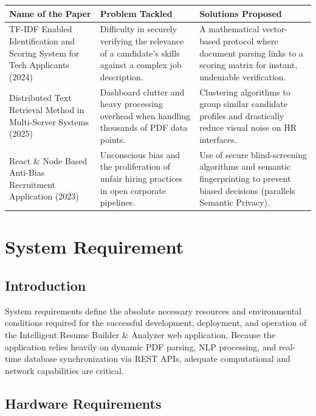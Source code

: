 \documentclass[12pt,a4paper]{report}
\begin{document}
\begin{table}[htbp]
\centering
\normalsize
\setlength{\tabcolsep}{6pt}
\renewcommand{\arraystretch}{1.5}

\begin{tabularx}{\textwidth}{|X|X|X|}
\hline
\textbf{Name of the Paper} & \textbf{Problem Tackled} & \textbf{Solutions Proposed} \\
\hline
TF-IDF Enabled Identification and Scoring System for Tech Applicants (2024)
& Difficulty in securely verifying the relevance of a candidate's skills against a complex job description.
& A mathematical vector-based protocol where document parsing links to a scoring matrix for instant, undeniable verification. \\
\hline
Distributed Text Retrieval Method in Multi-Server Systems (2025)
& Dashboard clutter and heavy processing overhead when handling thousands of PDF data points.
& Clustering algorithms to group similar candidate profiles and drastically reduce visual noise on HR interfaces. \\
\hline
React \& Node Based Anti-Bias Recruitment Application (2023)
& Unconscious bias and the proliferation of unfair hiring practices in open corporate pipelines.
& Use of secure blind-screening algorithms and semantic fingerprinting to prevent biased decisions (parallels Semantic Privacy). \\
\hline
\end{tabularx}
\end{table}

\chapter{System Requirement}

\section{Introduction}

System requirements define the absolute necessary resources and environmental conditions required for the successful development, deployment, and operation of the Intelligent Resume Builder \& Analyzer web application. Because the application relies heavily on dynamic PDF parsing, NLP processing, and real-time database synchronization via REST APIs, adequate computational and network capabilities are critical. 

\section{Hardware Requirements}
\end{document}
